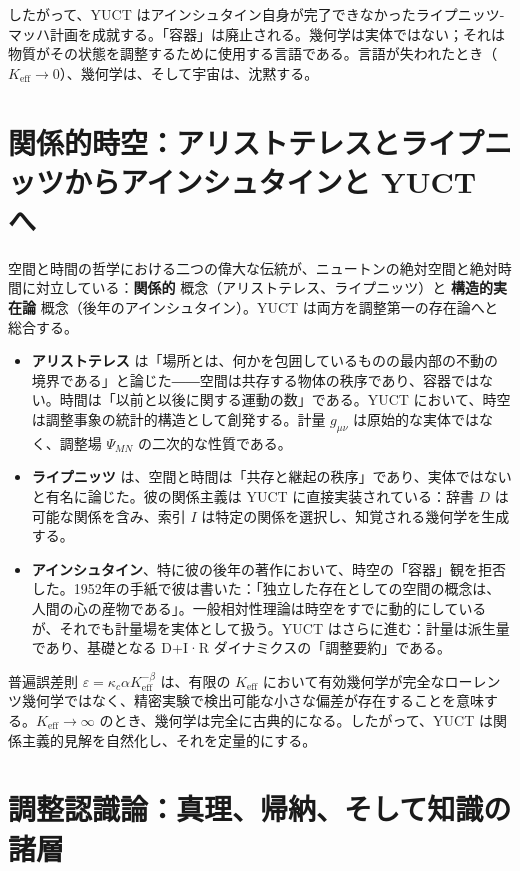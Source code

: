 \documentclass[12pt,a4paper]{article}
\begin{document}
	したがって、YUCT はアインシュタイン自身が完了できなかったライプニッツ-マッハ計画を成就する。「容器」は廃止される。幾何学は実体ではない；それは物質がその状態を調整するために使用する言語である。言語が失われたとき（\(K_{\mathrm{eff}} \to 0\)）、幾何学は、そして宇宙は、沈黙する。
	
	\section{関係的時空：アリストテレスとライプニッツからアインシュタインと YUCT へ}
	
	空間と時間の哲学における二つの偉大な伝統が、ニュートンの絶対空間と絶対時間に対立している：\textbf{関係的} 概念（アリストテレス、ライプニッツ）と \textbf{構造的実在論} 概念（後年のアインシュタイン）。YUCT は両方を調整第一の存在論へと総合する。
	
	\begin{itemize}
		\item \textbf{アリストテレス} は「場所とは、何かを包囲しているものの最内部の不動の境界である」と論じた――空間は共存する物体の秩序であり、容器ではない。時間は「以前と以後に関する運動の数」である。YUCT において、時空は調整事象の統計的構造として創発する。計量 \(g_{\mu\nu}\) は原始的な実体ではなく、調整場 \(\Psi_{MN}\) の二次的な性質である。
		
		\item \textbf{ライプニッツ} は、空間と時間は「共存と継起の秩序」であり、実体ではないと有名に論じた。彼の関係主義は YUCT に直接実装されている：辞書 \(D\) は可能な関係を含み、索引 \(I\) は特定の関係を選択し、知覚される幾何学を生成する。
		
		\item \textbf{アインシュタイン}、特に彼の後年の著作において、時空の「容器」観を拒否した。1952年の手紙で彼は書いた：「独立した存在としての空間の概念は、人間の心の産物である」。一般相対性理論は時空をすでに動的にしているが、それでも計量場を実体として扱う。YUCT はさらに進む：計量は派生量であり、基礎となる D+I·R ダイナミクスの「調整要約」である。
	\end{itemize}
	
	普遍誤差則 \(\varepsilon = \kappa_c \alpha K_{\mathrm{eff}}^{-\beta}\) は、有限の \(K_{\mathrm{eff}}\) において有効幾何学が完全なローレンツ幾何学ではなく、精密実験で検出可能な小さな偏差が存在することを意味する。\(K_{\mathrm{eff}} \to \infty\) のとき、幾何学は完全に古典的になる。したがって、YUCT は関係主義的見解を自然化し、それを定量的にする。
	
	\section{調整認識論：真理、帰納、そして知識の諸層}
	\label{sec:epistemology}
	
\end{document}
